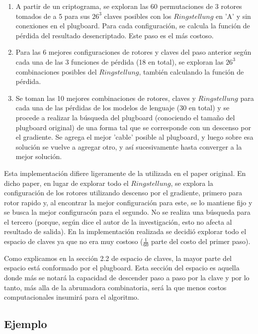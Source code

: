 \documentclass[a4paper,10pt]{article}
\begin{document}
\begin{enumerate}
  \item A partir de un criptograma, se exploran las 60 permutaciones de 3 rotores tomados de a 5 para sus $26^3$ claves posibles con los $Ringstellung$ en 'A' y sin conexiones en el plugboard. Para cada configuración, se calcula la función de pérdida del resultado desencriptado. Este paso es el más costoso.
  \item Para las 6 mejores configuraciones de rotores y claves del paso anterior según cada una de las 3 funciones de pérdida (18 en total), se exploran las $26^3$ combinaciones posibles del $Ringstellung$, también calculando la función de pérdida.
  \item Se toman las 10 mejores combinaciones de rotores, claves y $Ringstellung$ para cada una de las pérdidas de los modelos de lenguaje (30 en total) y se procede a realizar la búsqueda del plugboard (conociendo el tamaño del plugboard original) de una forma tal que se corresponde con un descenso por el gradiente. Se agrega el mejor 'cable' posible al plugboard, y luego sobre esa solución se vuelve a agregar otro, y así sucesivamente hasta converger a la mejor solución.
\end{enumerate}

Esta implementación difiere ligeramente de la utilizada en el paper original. En dicho paper, en lugar de explorar todo el $Ringstellung$, se explora la configuración de los rotores utilizando descenso por el gradiente, primero para rotor rapido y, al encontrar la mejor configuración para este, se lo mantiene fijo y se busca la mejor configuracón para el segundo. No se realiza una búsqueda para el tercero (porque, según dice el autor de la investigación, esto no afecta al resultado de salida). En la implementación realizada se decidió explorar todo el espacio de claves ya que no era muy costoso ($\frac{1}{60}$ parte del costo del primer paso).

Como explicamos en la sección 2.2 de espacio de claves, la mayor parte del espacio está conformado por el plugboard. Esta sección del espacio es aquella donde más se notará la capacidad de descender paso a paso por la clave y por lo tanto, más alla de la abrumadora combinatoria, será la que menos costos computacionales insumirá para el algoritmo.

\subsection{Ejemplo}
\end{document}
